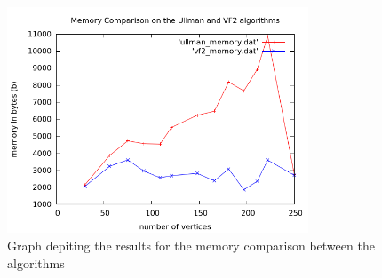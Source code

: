 \label{Memory Results}


\begin{figure}[H]
  \begin{center}
      \includegraphics[width=0.8\textwidth]{memory_comparison.png}
  \end{center}    
  \caption{Graph depiting the results for the memory comparison between the algorithms}
  \label{fig:memory_comparison}
\end{figure}
